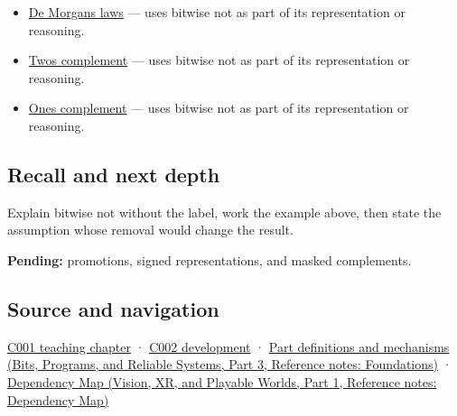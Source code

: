 \hypertarget{appendix-8f38927cfc54-used-by}{}

\begin{itemize}
\tightlist
\item
  \hyperref[appendix-9079d3659da4]{De Morgan\textquotesingle s laws} --- uses bitwise not as part of its representation or reasoning.
\item
  \hyperref[appendix-4fbc03d20829]{Two\textquotesingle s complement} --- uses bitwise not as part of its representation or reasoning.
\item
  \hyperref[appendix-03c678cd40b3]{One\textquotesingle s complement} --- uses bitwise not as part of its representation or reasoning.
\end{itemize}

\subsection{Recall and next depth}\label{appendix-8f38927cfc54-recall-and-next-depth}

\hypertarget{appendix-8f38927cfc54-recall-and-next-depth}{}

Explain bitwise not without the label, work the example above, then state the assumption whose removal would change the result.

\textbf{Pending:} promotions, signed representations, and masked complements.

\subsection{Source and navigation}\label{appendix-8f38927cfc54-source-and-navigation}

\hypertarget{appendix-8f38927cfc54-source-and-navigation}{}

\hyperref[01-foundations-i-ch001-from-a-signal-to-an-interpretation]{C001 teaching chapter} · \hyperref[01-foundations-i-ch001-arithmetic-becomes-a-policy]{C002 development} · \href{../01-Bits-Programs-and-Reliable-Systems-P03/main.pdf\#nameddest=appendix-fd090d982a15}{Part definitions and mechanisms (Bits, Programs, and Reliable Systems, Part 3, Reference notes: Foundations)} · \href{../07-Vision-XR-and-Playable-Worlds-P01/main.pdf\#nameddest=appendix-4ad47bdd269a}{Dependency Map (Vision, XR, and Playable Worlds, Part 1, Reference notes: Dependency Map)}
